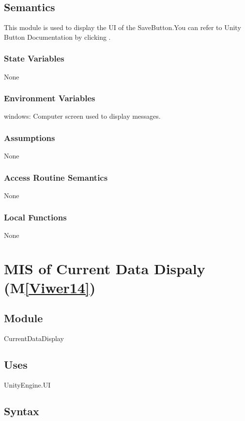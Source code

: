 \documentclass[12pt, titlepage]{article}
\newcommand{\mref}[1]{M\ref{#1}}
\begin{document}
\subsection{Semantics}
This module is used to display the UI of the SaveButton.You can refer to Unity Button Documentation by clicking \bref.
\subsubsection{State Variables}
None
\subsubsection{Environment Variables}
windows: Computer screen used to display messages.
\subsubsection{Assumptions}
None
\subsubsection{Access Routine Semantics}
None
\subsubsection{Local Functions}
None

\newpage


\newcommand{\tref}{\href{https://docs.unity3d.com/Packages/com.unity.ugui@1.0/manual/script-Text.html}{here}}

\section{MIS of Current Data Dispaly (\mref{Viwer14})} 

\subsection{Module}
CurrentDataDisplay

\subsection{Uses}
UnityEngine.UI 

\subsection{Syntax}
\end{document}
